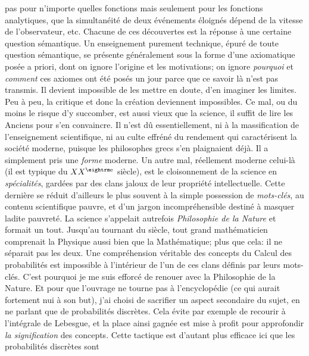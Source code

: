 pas pour n'importe quelles fonctions mais seulement pour les fonctions 
analytiques, que la simultan\'eit\'e de deux  \'ev\'enements \'eloign\'es 
d\'epend de la vitesse de l'observateur, etc.  Chacune de ces d\'ecouvertes  
est la r\'eponse \`a une certaine question s\'emantique. 
\medskip 
Un enseignement purement technique, \'epur\'e de toute question 
s\'eman\-ti\-que, se pr\'esente g\'en\'eralement sous la forme  
d'une axiomatique pos\'ee a priori, dont on ignore l'origine et les 
motivations;  on ignore {\it pourquoi}  et {\it comment} ces axiomes ont 
\'et\'e pos\'es un jour parce que ce savoir l\`a n'est pas transmis.  Il 
devient impossible de les mettre en doute,  d'en imaginer les limites. 
Peu \`a peu, la  critique et donc la cr\'eation  deviennent impossibles.  
\medskip 
Ce mal, ou du moins le risque d'y succomber, est aussi vieux que la 
science, il suffit de lire les Anciens pour s'en convaincre. Il n'est d\^u 
essentiellement, ni \`a la massification de l'enseignement scientifique, 
ni au culte effr\'en\'e du rendement qui  carac\-t\'e\-risent la 
soci\'et\'e moderne, puisque les philosophes grecs  s'en  plai\-gnaient 
d\'ej\`a. Il a simplement pris une {\it forme} moderne. 
\medskip 
Un autre mal, r\'eellement moderne celui-l\`a (il est typique du $XX^{\rm 
e}$ si\`ecle), est le cloisonnement de la science en {\it sp\'ecialit\'es}, 
gard\'ees par des clans jaloux de leur propri\'et\'e intellectuelle. Cette 
derni\`ere se r\'eduit d'ailleurs le plus souvent \`a la simple possession 
de  {\it mots-cl\'es}, au contenu scientifique pauvre, et d'un jargon  
incompr\'ehensible destin\'e \`a masquer ladite pauvret\'e. La science 
s'appelait autrefois {\it Philosophie de la Nature} et formait un tout. 
Jusqu'au tournant du si\`ecle, tout grand math\'ematicien comprenait la  
Physique aussi bien que la Math\'ematique; plus que cela: il ne s\'eparait 
pas les deux. Une compr\'ehension v\'eritable des concepts du Calcul des 
probabilit\'es  est impossible \`a l'int\'erieur de l'un de ces clans 
d\'efinis par leurs mots-cl\'es. C'est  pourquoi je me suis efforc\'e de 
renouer avec la Philosophie de la Nature. Et pour que l'ouvrage ne tourne 
pas \`a l'encyclop\'edie (ce qui aurait fortement  nui \`a son but), j'ai 
choisi de sacrifier un aspect secondaire du sujet, en ne parlant que de 
probabilit\'es discr\`etes. Cela \'evite par exemple de recourir \`a 
l'int\'egrale de Lebesgue, et la place ainsi gagn\'ee est mise \`a profit 
pour approfondir {\it la signification} des concepts. Cette tactique est 
d'autant plus efficace ici que les probabilit\'es discr\`etes sont 
